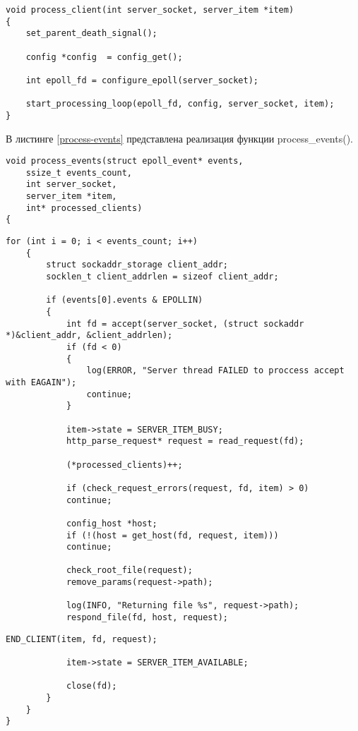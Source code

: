 \begin{lstlisting}[caption={Реализация функции process\_client()}, label=process-client]
void process_client(int server_socket, server_item *item)
{
	set_parent_death_signal();
	
	config *config  = config_get();
	
	int epoll_fd = configure_epoll(server_socket);
	
	start_processing_loop(epoll_fd, config, server_socket, item);
}
\end{lstlisting}

В листинге \ref{process-events} представлена реализация функции process\_events().

\begin{lstlisting}[caption={Реализация функции process\_client()}, label=process-events]
void process_events(struct epoll_event* events, 
	ssize_t events_count, 
	int server_socket, 
	server_item *item, 
	int* processed_clients)
{
\end{lstlisting}

\begin{lstlisting}[title={Продолжение листинга \ref{process-events}}, label=process-events1, firstnumber=7]
    for (int i = 0; i < events_count; i++) 
	{
		struct sockaddr_storage client_addr;
		socklen_t client_addrlen = sizeof client_addr;
		
		if (events[0].events & EPOLLIN) 
		{
			int fd = accept(server_socket, (struct sockaddr *)&client_addr, &client_addrlen);
			if (fd < 0)
			{
				log(ERROR, "Server thread FAILED to proccess accept with EAGAIN");
				continue;
			}
			
			item->state = SERVER_ITEM_BUSY;
			http_parse_request* request = read_request(fd);
			
			(*processed_clients)++;
			
			if (check_request_errors(request, fd, item) > 0)
			continue;
			
			config_host *host;
			if (!(host = get_host(fd, request, item)))
			continue;
			
			check_root_file(request);
			remove_params(request->path);
			
			log(INFO, "Returning file %s", request->path);
			respond_file(fd, host, request);
\end{lstlisting}

\begin{lstlisting}[title={Окончание листинга \ref{process-events}}, label=process-events2, firstnumber=38]
			END_CLIENT(item, fd, request);
			
			item->state = SERVER_ITEM_AVAILABLE;
			
			close(fd);
		}
	}
}
\end{lstlisting}

